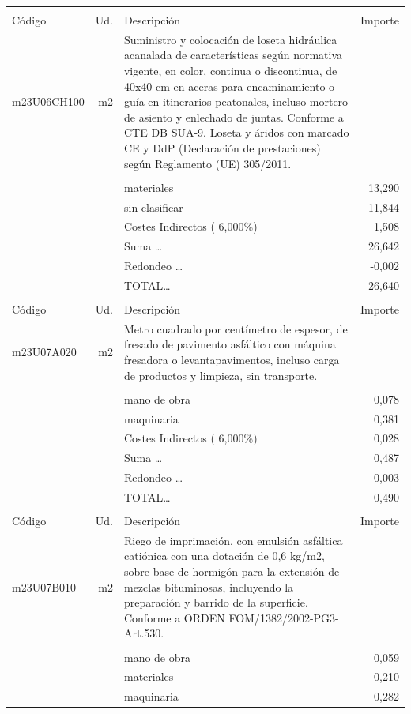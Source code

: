 \documentclass{book}%
\begin{document}
\begin{supertabular}{l r p{60mm} r}
&&&\\%
Código&Ud.&Descripción&Importe\\%
\hline%
m23U06CH100&m2&Suministro y colocación de loseta hidráulica acanalada de características según normativa vigente, en color, continua o discontinua, de 40x40 cm en aceras para encaminamiento o guía en itinerarios peatonales, incluso mortero de asiento y enlechado de juntas. Conforme a CTE DB SUA{-}9. Loseta y áridos con marcado CE y DdP (Declaración de prestaciones) según Reglamento (UE) 305/2011.&\\%
&&&\\%
&&materiales&    13,290\\%
&&sin clasificar&    11,844\\%
&&Costes Indirectos (     6,000\%)&     1,508\\%
&&Suma \ldots&    26,642\\%
&&Redondeo \ldots&    {-}0,002\\%
%
&&TOTAL\ldots&    26,640\\%
&&&\\%
Código&Ud.&Descripción&Importe\\%
\hline%
m23U07A020&m2&Metro cuadrado por centímetro de espesor, de fresado de pavimento asfáltico con máquina fresadora o levantapavimentos, incluso carga de productos y limpieza, sin transporte.&\\%
&&&\\%
&&mano de obra&     0,078\\%
&&maquinaria&     0,381\\%
&&Costes Indirectos (     6,000\%)&     0,028\\%
&&Suma \ldots&     0,487\\%
&&Redondeo \ldots&     0,003\\%
%
&&TOTAL\ldots&     0,490\\%
&&&\\%
Código&Ud.&Descripción&Importe\\%
\hline%
m23U07B010&m2&Riego de imprimación, con emulsión asfáltica catiónica con una dotación de 0,6 kg/m2, sobre base de hormigón para la extensión de mezclas bituminosas, incluyendo la preparación y barrido de la superficie. Conforme a ORDEN FOM/1382/2002{-}PG3{-}Art.530.&\\%
&&&\\%
&&mano de obra&     0,059\\%
&&materiales&     0,210\\%
&&maquinaria&     0,282\\%

\end{supertabular}
\end{document}

